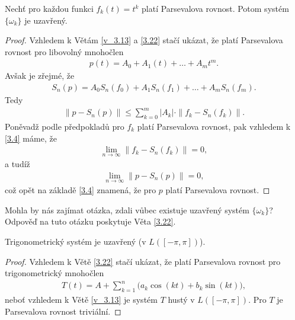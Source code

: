 \begin{dusledek}\label{3.23.dusledek}
Nechť pro každou funkci $f_k(t)=t^k$ platí Parsevalova rovnost. Potom systém $\{ \omega_k \}$ je uzavřený.
\end{dusledek}
\begin{proof}
Vzhledem k Větám \ref{v_3.13} a \ref{3.22} stačí ukázat, že platí Parsevalova rovnost pro libovolný mnohočlen
\begin{align*}
p(t) = A_0 + A_1(t) + \ldots + A_m t^m.
\end{align*}
Avšak je zřejmé, že
\begin{align*}
S_n(p) = A_0 S_n(f_0) + A_1 S_n(f_1) + \ldots + A_m S_n(f_m).
\end{align*}
Tedy
\begin{align*}
\|p - S_n(p)\| \leq \sum \limits _{k=0}^m |A_k| \cdot \|f_k - S_n(f_k)\|.
\end{align*}
Poněvadž podle předpokladů pro $f_k$ platí Parsevalova rovnost, pak vzhledem k \ref{3.4} máme, že
\begin{align*}
\lim_{n \rightarrow \infty} \|f_k - S_n(f_k)\|=0,
\end{align*}
a tudíž
\begin{align*}
\lim_{n \rightarrow \infty} \|p - S_n(p)\|=0,
\end{align*}
což opět na základě \ref{3.4} znamená, že pro $p$ platí Parsevalova rovnost.
\end{proof}


Mohla by nás zajímat otázka, zdali vůbec existuje uzavřený systém $\{ \omega_k \}$? Odpověď na tuto otázku poskytuje Věta \ref{3.22}.

\begin{dusledek}\label{3.24.dusledek}
Trigonometrický systém je uzavřený (v $L([-\pi,\pi])$).
\end{dusledek}
\begin{proof}
Vzhledem k Větě \ref{3.22} stačí ukázat, že platí Parsevalova rovnost pro trigonometrický mnohočlen
\begin{align*}
T(t) = A +  \sum \limits _{k=1}^n \Big(a_k \cos(kt) + b_k \sin(kt)\Big),
\end{align*}
neboť vzhledem k Větě  \ref{v_3.13} je systém ${T}$ hustý v $L([-\pi,\pi])$. Pro $T$ je Parsevalova rovnost triviální.
\end{proof}


